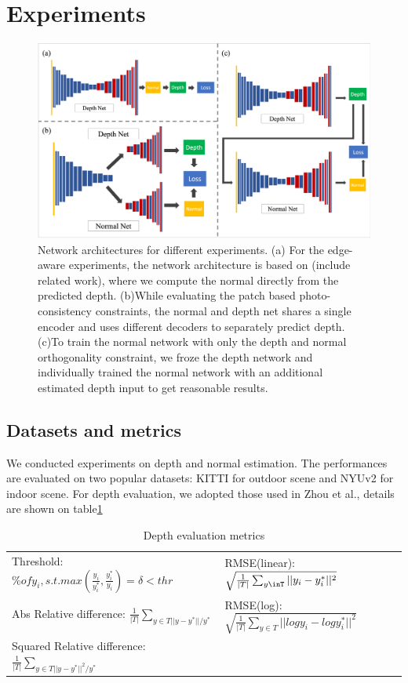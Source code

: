 \documentclass[10pt,twocolumn,letterpaper]{article}
\begin{document}
\section{Experiments}
\begin{figure}
  \includegraphics[width=\columnwidth ]{network.png}
  \caption{Network architectures for different experiments. (a) For the edge-aware experiments, the network architecture is based on (include related work), where we compute the normal directly from the predicted depth. (b)While evaluating the patch based photo-consistency constraints, the normal and depth net shares a single encoder and uses different decoders to separately predict depth. (c)To train the normal network with only the depth and normal orthogonality constraint, we froze the depth network and individually trained the normal network with an additional estimated depth input to get reasonable results.}
  \label{fig:network}
\end{figure}

\subsection{Datasets and metrics}
We conducted experiments on depth and normal estimation. The performances are evaluated on two popular datasets: KITTI for outdoor scene and NYUv2 for indoor scene.
For depth evaluation, we adopted those used in Zhou et al.\cite{zhou2017unsupervised}, details are shown on table\ref{table1:depth_eval}

\begin{table}
\centering
\label{table1:depth_eval}
\begin{tabular}{l|l}
 Threshold: $\% of y_i, s.t. max(\frac{y_i}{y_i^*}, \frac{y_i^*}{y_i})=\delta < thr $&  RMSE(linear):$\sqrt{\frac{1}{|T|}\sum_{y\inT}||y_i - y_i^*||^2}$ \\
 Abs Relative difference: $\frac{1}{|T|}\sum_{y\in T||y-y^*||/y^*}$ &  RMSE(log):$\sqrt{\frac{1}{|T|}\sum_{y \in T}||log y_i - log y_i^*||^2}$ \\
 Squared Relative difference:$\frac{1}{|T|}\sum_{y\in T||y-y^*||^2/y^*}$ & 
\end{tabular}
\caption{Depth evaluation metrics}
\end{table}
\end{document}
